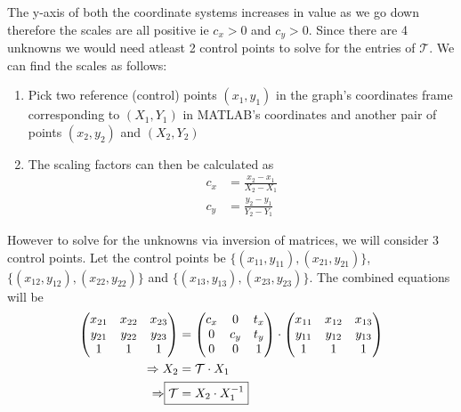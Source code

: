 \documentclass[12pt]{article}
\begin{document}
    The y-axis of both the coordinate systems increases in value as we go down therefore the scales are all positive ie 
    $c_{x} > 0$ and $c_{y} > 0$.
    Since there are 4 unknowns we would need atleast 2 control points to solve for the entries of $\mathcal{T}$.
    We can find the scales as follows:
    \begin{enumerate}
        \item Pick two reference (control) points $(x_{1},y_{1})$ in the graph's coordinates frame corresponding to 
        $(X_{1},Y_{1})$ in MATLAB's coordinates and another pair of points $(x_{2},y_{2})$ and $(X_{2},Y_{2})$
        \item  The scaling factors can then be calculated as 
        \begin{align*}
            c_{x} &= \frac{x_{2} - x_{1}}{X_{2} - X_{1}} \\
            c_{y} &= \frac{y_{2} - y_{1}}{Y_{2} - Y_{1}} 
        \end{align*}
    \end{enumerate}
    
    However to solve for the unknowns via inversion of matrices, we will consider 3 control points. Let
    the control points be $\{(x_{11},y_{11}),(x_{21},y_{21})\}$, $\{(x_{12},y_{12}),(x_{22},y_{22})\}$ and 
    $\{(x_{13},y_{13}),(x_{23},y_{23})\}$. The combined equations will be
    \begin{align}
        \begin{pmatrix}
            x_{21} & x_{22} & x_{23} \\
            y_{21} & y_{22} & y_{23} \\
            1 & 1 & 1
        \end{pmatrix}
        &= 
        \begin{pmatrix}
            c_{x} & 0 & t_{x} \\
            0  & c_{y} & t_{y} \\
            0 & 0 & 1
        \end{pmatrix} \cdot
        \begin{pmatrix}
            x_{11} & x_{12} & x_{13} \\
            y_{11} & y_{12} & y_{13} \\
            1 & 1 & 1
        \end{pmatrix} \nonumber \\
        \Rightarrow X_{2} &= \mathcal{T} \cdot X_{1} \nonumber \\
        \Rightarrow \label{T} \Aboxed{\mathcal{T} &= X_{2}\cdot X_{1}^{-1}}
    \end{align}
\end{document}
